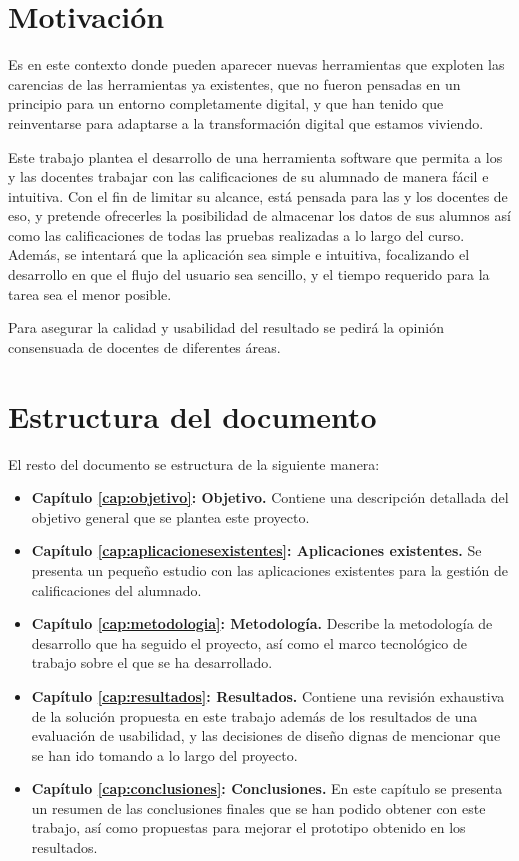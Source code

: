 \section{Motivación}

Es en este contexto donde pueden aparecer nuevas herramientas que exploten las carencias de las herramientas ya existentes, que no fueron pensadas en un principio para un entorno completamente digital, y que han tenido que reinventarse para adaptarse a la transformación digital que estamos viviendo. 

Este trabajo plantea el desarrollo de una herramienta software que permita a los y las docentes trabajar con las calificaciones de su alumnado de manera fácil e intuitiva. Con el fin de limitar su alcance, está pensada para las y los docentes de \gls{eso}, y pretende ofrecerles la posibilidad de almacenar los datos de sus alumnos así como las calificaciones de todas las pruebas realizadas a lo largo del curso. Además, se intentará que la aplicación sea simple e intuitiva, focalizando el desarrollo en que el flujo del usuario sea sencillo, y el tiempo requerido para la tarea sea el menor posible.

Para asegurar la calidad y usabilidad del resultado se pedirá la opinión consensuada de docentes de diferentes áreas.

\section{Estructura del documento}
El resto del documento se estructura de la siguiente manera:

\begin{itemize}
    \item \textbf{Capítulo \ref{cap:objetivo}: Objetivo.} Contiene una descripción detallada del objetivo general que se plantea este proyecto.
    \item \textbf{Capítulo \ref{cap:aplicacionesexistentes}: Aplicaciones existentes.} Se presenta un pequeño estudio con las aplicaciones existentes para la gestión de calificaciones del alumnado.
    \item \textbf{Capítulo \ref{cap:metodologia}: Metodología.} Describe la metodología de desarrollo que ha seguido el proyecto, así como el marco tecnológico de trabajo sobre el que se ha desarrollado.
    \item \textbf{Capítulo \ref{cap:resultados}: Resultados.} Contiene una revisión exhaustiva de la solución propuesta en este trabajo además de los resultados de una evaluación de usabilidad, y las decisiones de diseño dignas de mencionar que se han ido tomando a lo largo del proyecto.
    \item \textbf{Capítulo \ref{cap:conclusiones}: Conclusiones.} En este capítulo se presenta un resumen de las conclusiones finales que se han podido obtener con este trabajo, así como propuestas para mejorar el prototipo obtenido en los resultados.
\end{itemize}
